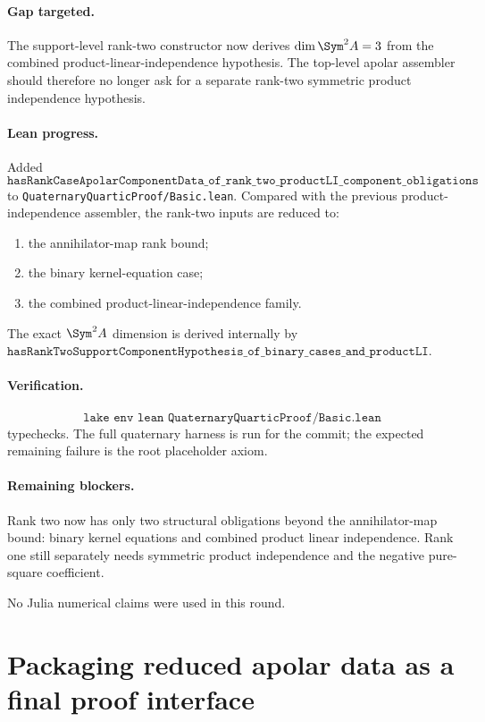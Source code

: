 \documentclass[11pt]{article}
\begin{document}
\paragraph{Gap targeted.}
The support-level rank-two constructor now derives \(\dim\Sym^2A=3\) from the
combined product-linear-independence hypothesis.  The top-level apolar
assembler should therefore no longer ask for a separate rank-two symmetric
product independence hypothesis.

\paragraph{Lean progress.}
Added
\[
\texttt{hasRankCaseApolarComponentData\_of\_rank\_two\_productLI\_component\_obligations}
\]
to \texttt{QuaternaryQuarticProof/Basic.lean}.  Compared with the previous
product-independence assembler, the rank-two inputs are reduced to:
\begin{enumerate}
\item the annihilator-map rank bound;
\item the binary kernel-equation case;
\item the combined product-linear-independence family.
\end{enumerate}
The exact \(\Sym^2A\) dimension is derived internally by
\(\texttt{hasRankTwoSupportComponentHypothesis\_of\_binary\_cases\_and\_productLI}\).

\paragraph{Verification.}
\[
\texttt{lake env lean QuaternaryQuarticProof/Basic.lean}
\]
typechecks.  The full quaternary harness is run for the commit; the expected
remaining failure is the root placeholder axiom.

\paragraph{Remaining blockers.}
Rank two now has only two structural obligations beyond the annihilator-map
bound: binary kernel equations and combined product linear independence.  Rank
one still separately needs symmetric product independence and the negative
pure-square coefficient.

No Julia numerical claims were used in this round.

\section*{Packaging reduced apolar data as a final proof interface}
\end{document}
